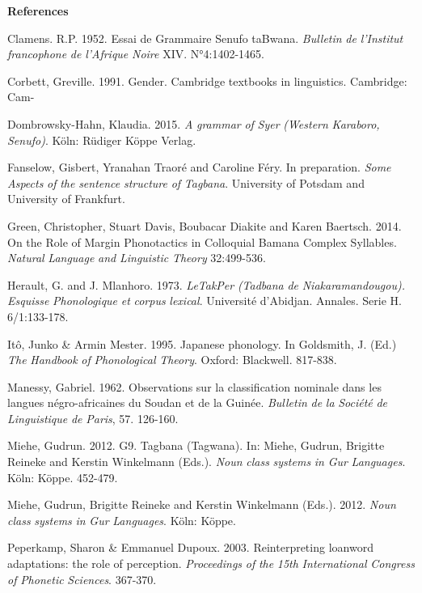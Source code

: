 \textbf{References}

Clamens. R.P. 1952. Essai de Grammaire Senufo taBwana. \textit{Bulletin} \textit{de} \textit{l’Institut} \textit{francophone} \textit{de} \textit{l’Afrique} \textit{Noire} XIV. N°4:1402-1465.

Corbett, Greville. 1991. Gender. Cambridge textbooks in linguistics. Cambridge: Cam-

Dombrowsky-Hahn, Klaudia. 2015. \textit{A} \textit{grammar} \textit{of} \textit{Syer} \textit{(Western} \textit{Karaboro,} \textit{Senufo)}. Köln: Rüdiger Köppe Verlag.

Fanselow, Gisbert, Yranahan Traoré and Caroline Féry. In preparation. \textit{Some} \textit{Aspects} \textit{of} \textit{the} \textit{sentence} \textit{structure} \textit{of} \textit{Tagbana}. University of Potsdam and University of Frankfurt.

Green, Christopher, Stuart Davis, Boubacar Diakite and Karen Baertsch. 2014. On the Role of Margin Phonotactics in Colloquial Bamana Complex Syllables. \textit{Natural} \textit{Language} \textit{and} \textit{Linguistic} \textit{Theory} 32:499-536.

Herault, G. and J. Mlanhoro. 1973. \textit{LeTakPer} \textit{(Tadbana} \textit{de} \textit{Niakaramandougou).} \textit{Esquisse} \textit{Phonologique} \textit{et} \textit{corpus} \textit{lexical}. Université d'Abidjan. Annales. Serie H. 6/1:133-178.

Itô, Junko \& Armin Mester. 1995. Japanese phonology. In Goldsmith, J. (Ed.) \textit{The} \textit{Handbook} \textit{of} \textit{Phonological} \textit{Theory}. Oxford: Blackwell. 817-838.

Manessy, Gabriel. 1962. Observations sur la classification nominale dans les langues négro-africaines du Soudan et de la Guinée. \textit{Bulletin} \textit{de} \textit{la} \textit{Société} \textit{de} \textit{Linguistique} \textit{de} \textit{Paris}, 57. 126-160.

Miehe, Gudrun. 2012. G9. Tagbana (Tagwana). In: Miehe, Gudrun, Brigitte Reineke and Kerstin Winkelmann (Eds.). \textit{Noun} \textit{class} \textit{systems} \textit{in} \textit{Gur} \textit{Languages}. Köln: Köppe. 452-479.

Miehe, Gudrun, Brigitte Reineke and Kerstin Winkelmann (Eds.). 2012. \textit{Noun} \textit{class} \textit{systems} \textit{in} \textit{Gur} \textit{Languages}. Köln: Köppe.

Peperkamp, Sharon \& Emmanuel Dupoux. 2003. Reinterpreting loanword adaptations: the role of perception. \textit{Proceedings} \textit{of} \textit{the} \textit{15th} \textit{International} \textit{Congress} \textit{of} \textit{Phonetic} \textit{Sciences}. 367-370.

